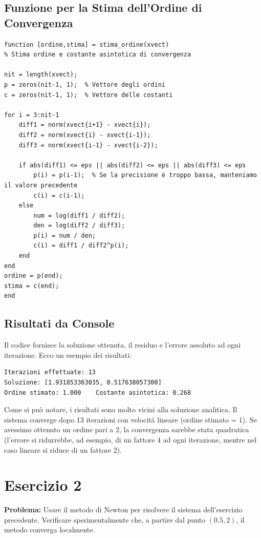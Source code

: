 \documentclass[11pt]{article}
\begin{document}
\subsection*{Funzione per la Stima dell'Ordine di Convergenza}

\begin{lstlisting}
function [ordine,stima] = stima_ordine(xvect)
% Stima ordine e costante asintotica di convergenza

nit = length(xvect);
p = zeros(nit-1, 1);  % Vettore degli ordini
c = zeros(nit-1, 1);  % Vettore delle costanti

for i = 3:nit-1
    diff1 = norm(xvect{i+1} - xvect{i});
    diff2 = norm(xvect{i} - xvect{i-1});
    diff3 = norm(xvect{i-1} - xvect{i-2});

    if abs(diff1) <= eps || abs(diff2) <= eps || abs(diff3) <= eps
        p(i) = p(i-1);  % Se la precisione è troppo bassa, manteniamo il valore precedente
        c(i) = c(i-1);
    else
        num = log(diff1 / diff2);
        den = log(diff2 / diff3);
        p(i) = num / den;
        c(i) = diff1 / diff2^p(i);
    end
end
ordine = p(end);
stima = c(end);
end
\end{lstlisting}

\subsection*{Risultati da Console}

Il codice fornisce la soluzione ottenuta, il residuo e l'errore assoluto ad ogni iterazione. Ecco un esempio dei risultati:
\begin{lstlisting}[style=console]
Iterazioni effettuate: 13 	 
Soluzione: [1.931853363035, 0.517638057300]
Ordine stimato: 1.000 	 Costante asintotica: 0.268
\end{lstlisting}

Come si può notare, i risultati sono molto vicini alla soluzione analitica. Il sistema converge dopo 13 iterazioni con velocità lineare (ordine stimato = 1). Se avessimo ottenuto un ordine pari a 2, la convergenza sarebbe stata quadratica (l'errore si ridurrebbe, ad esempio, di un fattore 4 ad ogni iterazione, mentre nel caso lineare si riduce di un fattore 2).

\section*{Esercizio 2}
\textbf{Problema:} Usare il metodo di Newton per risolvere il sistema dell’esercizio precedente. Verificare sperimentalmente che, a partire dal punto \((0.5,2)\), il metodo converga localmente.
\end{document}
